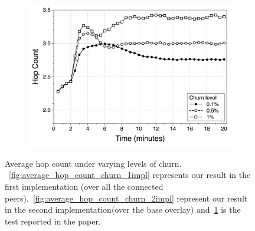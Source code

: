 \begin{figure}
\begin{subfigure}{.5\textwidth}
  \includegraphics[keepaspectratio=true, width=1\linewidth]{images/paper_average_hop_count_churn}
  \caption{}
  \label{fig:paper_average_hop_count_churn}
\end{subfigure}
\caption{Average hop count under varying levels of churn. ~\ref{fig:average_hop_count_churn_1impl} represents our result in the first implementation (\getMetropolisHastingsNeighbour over all the connected peers),~\ref{fig:average_hop_count_churn_2impl} represent our result in the second implementation(\getMetropolisHastingsNeighbour over the base overlay) and~\ref{fig:paper_average_hop_count_churn} is the test reported in the paper.}
\label{fig:robustness_hop_count_churn}
\end{figure}

